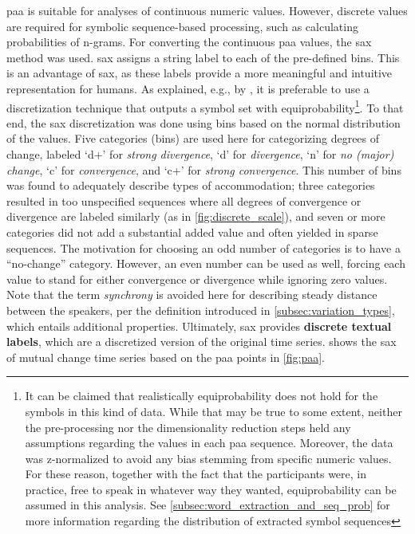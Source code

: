 \Ac{paa} is suitable for analyses of continuous numeric values.
However, discrete values are required for symbolic sequence-based processing, such as calculating probabilities of n-grams.
For converting the continuous \ac{paa} values, the \acl{sax} \citep[\acs{sax};][]{Lin2007experiencing} method was used.
\Ac{sax} assigns a string label to each of the pre-defined bins.
This is an advantage of \ac{sax}, as these labels provide a more meaningful and intuitive representation for humans.
As explained, e.g., by \citet{Apostolico2003monotony}, it is preferable to use a discretization technique that outputs a symbol set with equiprobability\footnote{It can be claimed that realistically equiprobability does not hold for the symbols in this kind of data.
While that may be true to some extent, neither the pre-processing nor the dimensionality reduction steps held any assumptions regarding the values in each \ac{paa} sequence.
Moreover, the data was z-normalized to avoid any bias stemming from specific numeric values.
For these reason, together with the fact that the participants were, in practice, free to speak in whatever way they wanted, equiprobability can be assumed in this analysis.
See \cref{subsec:word_extraction_and_seq_prob} for more information regarding the distribution of extracted symbol sequences}.
To that end, the \ac{sax} discretization was done using bins based on the normal distribution of the values.
Five categories (bins) are used here for categorizing degrees of change, labeled \enquote*{d+} for \emph{strong divergence}, \enquote*{d} for \emph{divergence}, \enquote*{n} for \emph{no (major) change}, \enquote*{c} for \emph{convergence}, and \enquote*{c+} for \emph{strong convergence}.
This number of bins was found to adequately describe types of accommodation;
three categories resulted in too unspecified sequences where all degrees of convergence or divergence are labeled similarly (as in \cref{fig:discrete_scale}), and seven or more categories did not add a substantial added value and often yielded in sparse sequences.
The motivation for choosing an odd number of categories is to have a \enquote{no-change} category.
However, an even number can be used as well, forcing each value to stand for either convergence or divergence while ignoring zero values.
Note that the term \emph{synchrony} is avoided here for describing steady distance between the speakers, per the definition introduced in \cref{subsec:variation_types}, which entails additional properties.
Ultimately, \ac{sax} provides \textbf{discrete textual labels}, which are a discretized version of the original time series.
 shows the \ac{sax} of mutual change time series based on the \ac{paa} points in \cref{fig:paa}.

